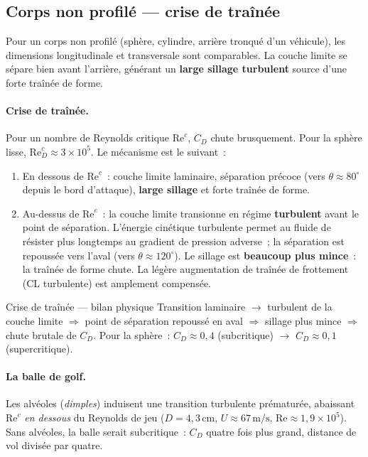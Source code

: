 \documentclass[11pt,a4paper]{report}
\begin{document}
\subsection{Corps non profil\'e --- crise de tra\^in\'ee}

Pour un corps non profil\'e (sph\`ere, cylindre, arri\`ere tronqu\'e d'un v\'ehicule),
les dimensions longitudinale et transversale sont comparables. La couche limite se
s\'epare bien avant l'arri\`ere, g\'en\'erant un \textbf{large sillage turbulent}
source d'une forte tra\^in\'ee de forme.

\paragraph{Crise de tra\^in\'ee.}
Pour un nombre de Reynolds critique $\mathrm{Re}^c$, $C_D$ chute brusquement. Pour
la sph\`ere lisse, $\mathrm{Re}_D^c \approx 3\times10^5$. Le m\'ecanisme est le
suivant~:

\begin{enumerate}
  \item En dessous de $\mathrm{Re}^c$~: couche limite laminaire, s\'eparation pr\'ecoce
    (vers $\theta\approx 80^\circ$ depuis le bord d'attaque), \textbf{large sillage}
    et forte tra\^in\'ee de forme.
  \item Au-dessus de $\mathrm{Re}^c$~: la couche limite transionne en r\'egime
    \textbf{turbulent} avant le point de s\'eparation. L'\'energie cin\'etique turbulente
    permet au fluide de r\'esister plus longtemps au gradient de pression adverse~;
    la s\'eparation est repouss\'ee vers l'aval (vers $\theta\approx 120^\circ$). Le
    sillage est \textbf{beaucoup plus mince}~: la tra\^in\'ee de forme chute. La l\'eg\`ere
    augmentation de tra\^in\'ee de frottement (CL turbulente) est amplement compens\'ee.
\end{enumerate}

\begin{importantbox}{Crise de tra\^in\'ee --- bilan physique}
Transition laminaire $\to$ turbulent de la couche limite $\Rightarrow$ point de s\'eparation
repouss\'e en aval $\Rightarrow$ sillage plus mince $\Rightarrow$ chute brutale de $C_D$.
Pour la sph\`ere~: $C_D \approx 0{,}4$ (subcritique) $\to$ $C_D \approx 0{,}1$
(supercritique).
\end{importantbox}

\paragraph{La balle de golf.}
Les alv\'eoles (\emph{dimples}) induisent une transition turbulente pr\'ematur\'ee,
abaissant $\mathrm{Re}^c$ \emph{en dessous} du Reynolds de jeu ($D=4{,}3\,\text{cm}$,
$U\approx 67\,\text{m/s}$, $\mathrm{Re}\approx 1{,}9\times10^5$). Sans alv\'eoles,
la balle serait subcritique~: $C_D$ quatre fois plus grand, distance de vol divis\'ee
par quatre.
\end{document}
